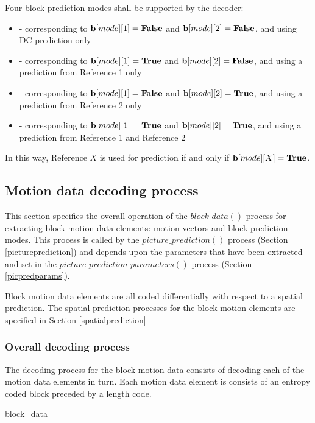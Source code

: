 Four block prediction modes shall be supported by the decoder: 

\begin{itemize}
\item \Intra - corresponding to ${\bf b}[mode][1]=\text{\bf{False}}$ and ${\bf b}[mode][2]=\text{\bf{False}}$, and using DC prediction only
\item \RefOneOnly - corresponding to ${\bf b}[mode][1]=\text{\bf{True}}$ and ${\bf b}[mode][2]=\text{\bf{False}}$, and using a prediction from Reference 1 only
\item \RefTwoOnly - corresponding to ${\bf b}[mode][1]=\text{\bf{False}}$ and ${\bf b}[mode][2]=\text{\bf{True}}$, and using a prediction from Reference 2 only
\item \RefOneAndTwo - corresponding to ${\bf b}[mode][1]=\text{\bf{True}}$ and ${\bf b}[mode][2]=\text{\bf{True}}$, and using a prediction from Reference 1 and Reference 2
\end{itemize}

In this way, Reference $X$ is used for prediction if and only if ${\bf b}[mode][X]=\text{\bf{True}}$. 

\subsection{Motion data decoding process}

This section specifies the overall operation of the $block\_data()$ process for extracting
block motion data elements: motion vectors and block prediction modes. This 
process is called by the $picture\_prediction()$ process (Section \ref{pictureprediction}) and
depends upon the parameters that have been extracted and set in the
$picture\_prediction\_parameters()$ process (Section \ref{picpredparams}).

Block motion data elements are all coded differentially with respect to a spatial prediction. The
spatial prediction processes for the block motion elements are specified in Section \ref{spatialprediction}

\subsubsection{Overall decoding process}

\label{decodingprocess}

The decoding process for the block motion data consists of decoding each of the motion data elements in turn. Each
motion data element is consists of an entropy coded block preceded by a length code.

\begin{pseudo}{block\_data}{}
\bsEND
{}
\end{pseudo}

